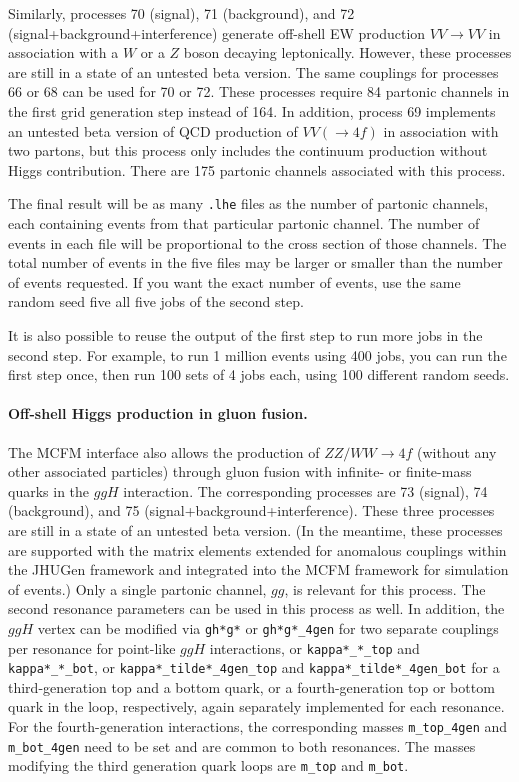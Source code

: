 \documentclass[aps,superscriptaddress,nofootinbib]{revtex4}
\begin{document}
Similarly, processes 70 (signal), 71 (background), and 72 (signal+background+interference) generate off-shell EW production $VV\to VV$ 
in association with a $W$ or a $Z$ boson decaying leptonically.  However, these processes are still in a state of an untested beta version.
The same couplings for processes 66 or 68 can be used for 70 or 72. These processes require 84 partonic channels in the first grid generation 
step instead of 164. In addition, process 69 implements an untested beta version of QCD production of $VV(\to 4f)$ in association with two partons, 
but this process only includes the continuum production without Higgs contribution. There are 175 partonic channels associated with this process.

The final result will be as many \texttt{.lhe} files as the number of partonic channels, each containing events from that particular partonic channel.  
The number of events in each file will be proportional to the cross section of those channels.  The total number of events in the five files may be 
larger or smaller than the number of events requested.  If you want the exact number of events, use the same random seed five all five jobs of the second step.

It is also possible to reuse the output of the first step to run more jobs in the second step.  For example, to run 1 million events using 400 jobs, 
you can run the first step once, then run 100 sets of 4 jobs each, using 100 different random seeds.

\paragraph{Off-shell Higgs production in gluon fusion.}
\label{sec:offshellggH}

The MCFM interface also allows the production of $ZZ/WW\to4f$ (without any other associated particles) through gluon fusion with infinite- or 
finite-mass quarks in the $ggH$ interaction. The corresponding processes are 73 (signal), 74 (background), and 75 (signal+background+interference). 
These three processes are still in a state of an untested beta version. (In the meantime, these processes are supported with the matrix elements
extended for anomalous couplings within the JHUGen framework and integrated into the MCFM framework for simulation of events.)
Only a single partonic channel, $gg$, is relevant for this process. The second resonance parameters can be used in this process as well. 
In addition, the $ggH$ vertex can be modified via \verb|gh*g*| or \verb|gh*g*_4gen| for two separate couplings per resonance for point-like 
$ggH$ interactions, or \verb|kappa*_*_top| and \verb|kappa*_*_bot|, or \verb|kappa*_tilde*_4gen_top| and \verb|kappa*_tilde*_4gen_bot| 
for a third-generation top and a bottom quark, or a fourth-generation top or bottom quark in the loop, respectively, again separately 
implemented for each resonance. For the fourth-generation interactions, the corresponding masses \verb|m_top_4gen| and \verb|m_bot_4gen| 
need to be set and are common to both resonances. The masses modifying the third generation quark loops are \verb|m_top| and \verb|m_bot|.
\end{document}
